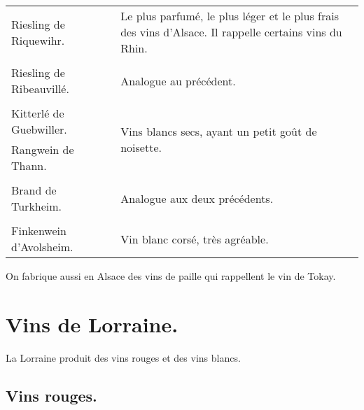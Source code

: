 \scriptsize
\begin{longtable}{m{10em}m{12em}m{12em}}                                                    
  Riesling de Riquewihr.   &                     & Le plus parfumé, le plus léger et le plus frais des vins d'Alsace. 
                                                   Il rappelle certains vins du Rhin.                                  \\
                           &                     &                                                                     \\
  Riesling de Ribeauvillé. &                     & Analogue au précédent.                                              \\
                           &                     &                                                                     \\
  Kitterlé de Guebwiller.  &                     & \multirow{2}{12em}{Vins blancs secs, ayant un petit 
                                                   goût de noisette.}                                                  \\
  Rangwein de Thann.       &                     &                                                                     \\
                           &                     &                                                                     \\
  Brand de Turkheim.       &                     & Analogue aux deux précédents.                                       \\
                           &                     &                                                                     \\
  Finkenwein d'Avolsheim.  &                     & Vin blanc corsé, très agréable.                                     \\
\end{longtable}
\normalsize

On fabrique aussi en Alsace des vins de paille qui rappellent le vin de Tokay.
                           
\section*{\centering Vins de Lorraine.}

La Lorraine produit des vins rouges et des vins blancs.

\subsection*{\centering \small\sc Vins rouges.}

